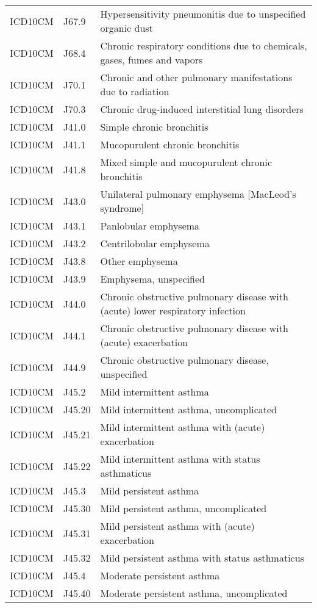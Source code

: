 \begin{table}[ht]
\begin{tabular}{lll}
  ICD10CM & J67.9 & Hypersensitivity pneumonitis due to unspecified organic dust \\ 
  ICD10CM & J68.4 & Chronic respiratory conditions due to chemicals, gases, fumes and vapors \\ 
  ICD10CM & J70.1 & Chronic and other pulmonary manifestations due to radiation \\ 
  ICD10CM & J70.3 & Chronic drug-induced interstitial lung disorders \\ 
  ICD10CM & J41.0 & Simple chronic bronchitis \\ 
  ICD10CM & J41.1 & Mucopurulent chronic bronchitis \\ 
  ICD10CM & J41.8 & Mixed simple and mucopurulent chronic bronchitis \\ 
  ICD10CM & J43.0 & Unilateral pulmonary emphysema [MacLeod's syndrome] \\ 
  ICD10CM & J43.1 & Panlobular emphysema \\ 
  ICD10CM & J43.2 & Centrilobular emphysema \\ 
  ICD10CM & J43.8 & Other emphysema \\ 
  ICD10CM & J43.9 & Emphysema, unspecified \\ 
  ICD10CM & J44.0 & Chronic obstructive pulmonary disease with (acute) lower respiratory infection \\ 
  ICD10CM & J44.1 & Chronic obstructive pulmonary disease with (acute) exacerbation \\ 
  ICD10CM & J44.9 & Chronic obstructive pulmonary disease, unspecified \\ 
  ICD10CM & J45.2 & Mild intermittent asthma \\ 
  ICD10CM & J45.20 & Mild intermittent asthma, uncomplicated \\ 
  ICD10CM & J45.21 & Mild intermittent asthma with (acute) exacerbation \\ 
  ICD10CM & J45.22 & Mild intermittent asthma with status asthmaticus \\ 
  ICD10CM & J45.3 & Mild persistent asthma \\ 
  ICD10CM & J45.30 & Mild persistent asthma, uncomplicated \\ 
  ICD10CM & J45.31 & Mild persistent asthma with (acute) exacerbation \\ 
  ICD10CM & J45.32 & Mild persistent asthma with status asthmaticus \\ 
  ICD10CM & J45.4 & Moderate persistent asthma \\ 
  ICD10CM & J45.40 & Moderate persistent asthma, uncomplicated \\ 

\end{tabular}
\end{table}

